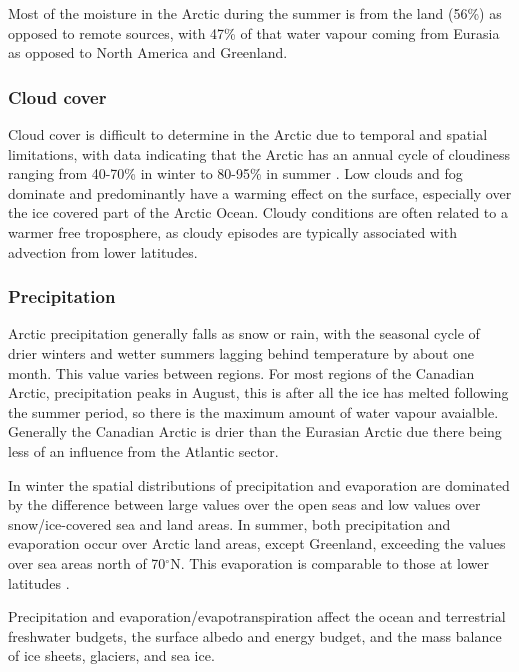\documentclass[12pt, oneside]{article}
\begin{document}


Most of the moisture in the Arctic during the summer is from the land (56\%) as opposed to remote sources\cite{harrington2021terrestrial}, with 47\% of that water vapour coming from Eurasia as opposed to North America and Greenland.



\subsubsection{Cloud cover}
Cloud cover is difficult to determine in the Arctic due to temporal and spatial limitations, with data indicating that the Arctic has an annual cycle of cloudiness ranging from 40-70\% in winter to 80-95\% in summer \cite{vihma2016atmospheric}. Low clouds and fog dominate and predominantly have a warming effect on the surface, especially over the ice covered part of the Arctic Ocean. Cloudy conditions are often related to a warmer free troposphere, as cloudy episodes are typically associated with advection from lower latitudes. 


\subsubsection{Precipitation}
Arctic precipitation generally falls as snow or rain, with the seasonal cycle of drier winters and wetter summers lagging behind temperature by about one month. This value varies between regions. For most regions of the Canadian Arctic, precipitation peaks in August, this is after all the ice has melted following the summer period, so there is the maximum amount of water vapour avaialble\cite{serreze2022characteristics}. Generally the Canadian Arctic is drier than the Eurasian Arctic due there being less of an influence from the Atlantic sector. 


In winter the spatial distributions of precipitation and evaporation are dominated by the difference between large values over the open seas and low values over snow/ice-covered sea and land areas. In summer, both precipitation and evaporation occur over Arctic land areas, except Greenland, exceeding the values over sea areas north of 70$^{\circ}$N. This evaporation is comparable to those at lower latitudes \cite{vihma2016atmospheric}. 

Precipitation and evaporation/evapotranspiration affect the ocean and terrestrial freshwater budgets, the surface albedo and energy budget, and the mass balance of ice sheets, glaciers, and sea ice. 
\end{document}
